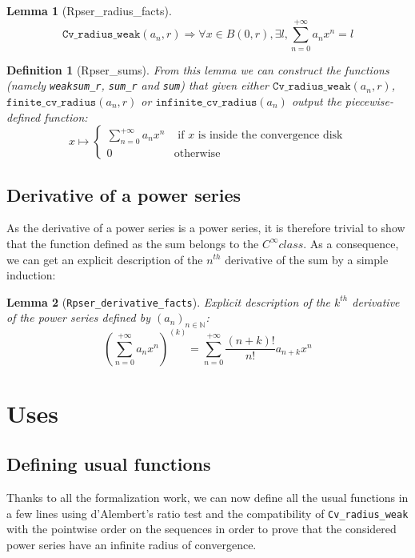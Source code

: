 \documentclass[submission,copyright]{eptcs}
\newcommand{\N}{\mathbb{N}}
\newcommand{\cvrw}{\texttt{Cv\_radius\_weak}}
\newcommand{\fcvr}{\texttt{finite\_cv\_radius}}
\newcommand{\icvr}{\texttt{infinite\_cv\_radius}}
\newtheorem{definition}{Definition}
\newtheorem{lemma}{Lemma}
\begin{document}
\begin{lemma}[Rpser\_radius\_facts] $$\cvrw{}(a_n,r) \Rightarrow
\forall x \in B(0,r), \exists l, \sum_{n=0}^{+\infty} a_n x^n = l$$
\end{lemma}

\begin{definition}[Rpser\_sums] From this lemma we can construct the functions
(namely \texttt{weaksum\_r}, \texttt{sum\_r} and \texttt{sum}) that given either
$\cvrw{}(a_n,r)$, $\fcvr{}(a_n,r)$ or $\icvr{}(a_n)$ output the piecewise-defined
function: $$x \mapsto \left\lbrace
\begin{array}{ll}
\sum_{n=0}^{+\infty} a_n x^n & \text{ if } x \text{ is inside the convergence
disk}\\
0 & \text{otherwise}
\end{array}\right.$$
\end{definition}

\subsection{Derivative of a power series}


As the derivative of a power series is a power series, it is therefore trivial
to show that the function defined as the sum belongs to the $C^{\infty} class$.
As a consequence, we can get an explicit description of the $n^{th}$ derivative
of the sum by a simple induction:

\begin{lemma}[\texttt{Rpser\_derivative\_facts}] Explicit description of the
$k^{th}$ derivative of the power series defined by $(a_n)_{n\in \N}$:
$$(\sum_{n=0}^{+\infty} a_n x^n)^{(k)} = \sum_{n=0}^{+\infty}
\frac{(n + k)!}{n!} a_{n+k} x^n$$
\end{lemma}

\section{Uses}

\subsection{Defining usual functions}

Thanks to all the formalization work, we can now define all the usual functions
in a few lines using d'Alembert's ratio test and the compatibility of \cvrw{}
with the pointwise order on the sequences in order to prove that the considered
power series have an infinite radius of convergence.
\end{document}
